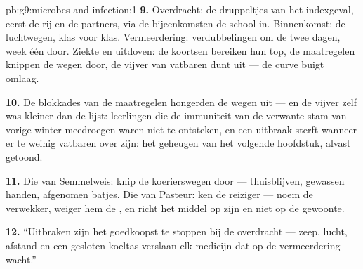 \begin{solution}{pb:g9:microbes-and-infection:1}
\textbf{9.} Overdracht: de druppeltjes van het indexgeval, eerst de
rij en de partners, via de bijeenkomsten de school in. Binnenkomst:
de luchtwegen, klas voor klas. Vermeerdering: verdubbelingen om de
twee dagen, week één door. Ziekte en uitdoven: de koortsen bereiken
hun top, de maatregelen knippen de wegen door, de vijver van
vatbaren dunt uit --- de curve buigt omlaag.

\textbf{10.} De blokkades van de maatregelen hongerden de wegen
uit --- en de vijver zelf was kleiner dan de lijst: leerlingen die
de immuniteit van de verwante stam van vorige winter meedroegen
waren niet te ontsteken, en een uitbraak sterft wanneer er te
weinig vatbaren over zijn: het geheugen van het volgende
hoofdstuk, alvast getoond.

\textbf{11.} Die van Semmelweis: knip de koerierswegen door ---
thuisblijven, gewassen handen, afgenomen batjes. Die van Pasteur:
ken de reiziger --- noem de verwekker, weiger hem de
, en richt het middel op zijn  en niet op de
gewoonte.

\textbf{12.} ``Uitbraken zijn het goedkoopst te stoppen bij de
overdracht --- zeep, lucht, afstand en een gesloten koeltas
verslaan elk medicijn dat op de vermeerdering wacht.''
\end{solution}
